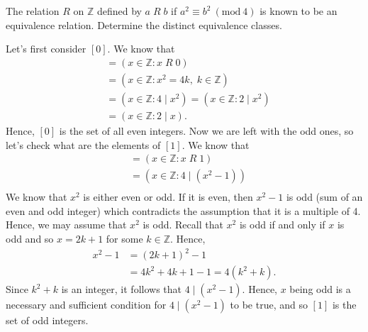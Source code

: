 \documentclass[12pt]{article}
\newcommand{\Z}{\mathbb{Z}}
\newcommand{\Mod}[1]{\ (\mathrm{mod}\ #1)}
\newenvironment{problem}[2][Problem]{\begin{trivlist} \item[\hskip \labelsep {\bfseries #1}\hskip \labelsep {\bfseries #2.}]}{\end{trivlist}}
\newenvironment{solution}[2][Solution]{\begin{trivlist} \item[\hskip \labelsep {\bfseries #1}\hskip \labelsep {\bfseries #2.}]}{\end{trivlist}}
\begin{document}
\begin{problem}{47}
  The relation $R$ on $\Z$ defined by $a \; R \; b$ if $a^{2} \equiv b^{2} \Mod{4}$ is known to be
  an equivalence relation. Determine the distinct equivalence classes.
  \begin{solution}{47}
    Let's first consider $[0]$. We know that
    \begin{align*}
      [0] &= \left(x\in\Z:x\; R\;0 \right)\\
      &= \left(x\in\Z: x^{2} = 4k,\; k\in \Z\right)\\
      &= \left(x\in\Z: 4\mid x^{2}\right) = \left(x\in\Z: 2\mid x^{2}\right)\\
      &= \left(x\in\Z:2\mid x\right). 
    \end{align*}
    Hence, $[0]$ is the set of all even integers. Now we are left with the odd ones, so let's check what are the elements of $[1]$. We know that
    \begin{align*}
       [1] &= \left(x\in\Z:x\; R\;1 \right)\\
       &= \left(x\in\Z: 4\mid (x^{2}-1)\right)\\
    \end{align*}
    We know that $x^{2}$ is either even or odd. If it is even, then $x^{2}-1$ is odd (sum of an even and odd integer) which contradicts the assumption that it is a multiple of 4. Hence, we may assume that $x^{2}$ is odd. Recall that $x^{2}$ is odd if and only if $x$ is odd and so $x=2k+1$ for some $k\in\Z$. Hence, 
    \begin{align*}
      x^{2}-1 &= (2k+1)^{2}-1 \\
      &= 4k^{2} + 4k +1 -1 = 4(k^{2}+k).
    \end{align*}
    Since $k^{2}+k$ is an integer, it follows that $4\mid(x^{2}-1)$. Hence, $x$ being odd is a necessary and sufficient condition for $4\mid(x^{2}-1)$ to be true, and so $[1]$ is the set of odd integers.
  \end{solution}
\end{problem}
\end{document}
